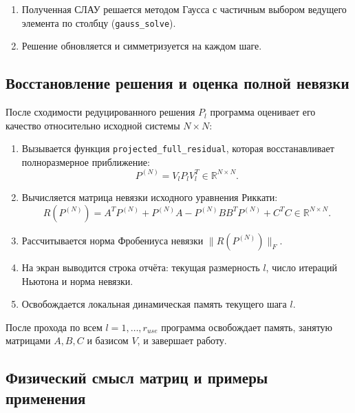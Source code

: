 \documentclass[12pt, a4paper, oneside]{extarticle}
\begin{document}
\begin{enumerate}
    \item Полученная СЛАУ решается методом Гаусса с частичным выбором
    ведущего элемента по столбцу (\texttt{gauss\_solve}).

    \item Решение обновляется и симметризуется на каждом шаге.
\end{enumerate}

\subsection{Восстановление решения и оценка полной невязки}

После сходимости редуцированного решения $P_l$ программа оценивает его качество
относительно исходной системы $N \times N$:
\begin{enumerate}
    \item Вызывается функция \texttt{projected\_full\_residual}, которая
    восстанавливает полноразмерное приближение:
    \begin{equation*}
        P^{(N)} = V_l P_l V_l^T \in \mathbb{R}^{N \times N}.
    \end{equation*}

    \item Вычисляется матрица невязки исходного уравнения Риккати:
    \begin{equation*}
        R\!\left(P^{(N)}\right)
        = A^T P^{(N)} + P^{(N)} A - P^{(N)} B B^T P^{(N)} + C^T C
        \in \mathbb{R}^{N \times N}.
    \end{equation*}

    \item Рассчитывается норма Фробениуса невязки $\|R(P^{(N)})\|_F$.

    \item На экран выводится строка отчёта: текущая размерность $l$, число
    итераций Ньютона и норма невязки.

    \item Освобождается локальная динамическая память текущего шага $l$.
\end{enumerate}

После прохода по всем $l = 1,\dots,r_{use}$ программа освобождает память,
занятую матрицами $A,B,C$ и базисом $V$, и завершает работу.

\subsection{Физический смысл матриц и примеры применения}
\end{document}
